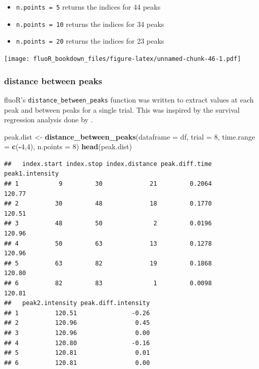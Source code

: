 \documentclass[
]{book}
\newenvironment{Shaded}{\begin{snugshade}}{\end{snugshade}}
\newcommand{\DataTypeTok}[1]{\textcolor[rgb]{0.13,0.29,0.53}{#1}}
\newcommand{\DecValTok}[1]{\textcolor[rgb]{0.00,0.00,0.81}{#1}}
\newcommand{\KeywordTok}[1]{\textcolor[rgb]{0.13,0.29,0.53}{\textbf{#1}}}
\newcommand{\NormalTok}[1]{#1}
\newcommand{\OperatorTok}[1]{\textcolor[rgb]{0.81,0.36,0.00}{\textbf{#1}}}
\newcommand{\StringTok}[1]{\textcolor[rgb]{0.31,0.60,0.02}{#1}}
\providecommand{\tightlist}{%
  \setlength{\itemsep}{0pt}\setlength{\parskip}{0pt}}
\begin{document}
\begin{itemize}
\tightlist
\item
  \texttt{n.points\ =\ 5} returns the indices for 44 peaks
\item
  \texttt{n.points\ =\ 10} returns the indices for 34 peaks
\item
  \texttt{n.points\ =\ 20} returns the indices for 23 peaks
\end{itemize}

\texttt{[image: fluoR\_bookdown\_files/figure-latex/unnamed-chunk-46-1.pdf]}

\hypertarget{analysis-metrics-peaks-distance}{%
\subsubsection{distance between peaks}\label{analysis-metrics-peaks-distance}}

fluoR's \texttt{distance\_between\_peaks} function was written to extract values at each peak and between peaks for a single trial. This was inspired by the survival regression analysis done by \citep{gunaydin_natural_2014}.

\begin{Shaded}
\begin{Highlighting}[]
\NormalTok{peak.dist <-}\StringTok{ }\KeywordTok{distance_between_peaks}\NormalTok{(}\DataTypeTok{dataframe =}\NormalTok{ df,}
                                    \DataTypeTok{trial =} \DecValTok{8}\NormalTok{,}
                                    \DataTypeTok{time.range =} \KeywordTok{c}\NormalTok{(}\OperatorTok{-}\DecValTok{4}\NormalTok{,}\DecValTok{4}\NormalTok{),}
                                    \DataTypeTok{n.points =} \DecValTok{8}\NormalTok{)}
\KeywordTok{head}\NormalTok{(peak.dist)}
\end{Highlighting}
\end{Shaded}

\begin{verbatim}
##   index.start index.stop index.distance peak.diff.time peak1.intensity
## 1           9         30             21         0.2064          120.77
## 2          30         48             18         0.1770          120.51
## 3          48         50              2         0.0196          120.96
## 4          50         63             13         0.1278          120.96
## 5          63         82             19         0.1868          120.80
## 6          82         83              1         0.0098          120.81
##   peak2.intensity peak.diff.intensity
## 1          120.51               -0.26
## 2          120.96                0.45
## 3          120.96                0.00
## 4          120.80               -0.16
## 5          120.81                0.01
## 6          120.81                0.00
\end{verbatim}
\end{document}
